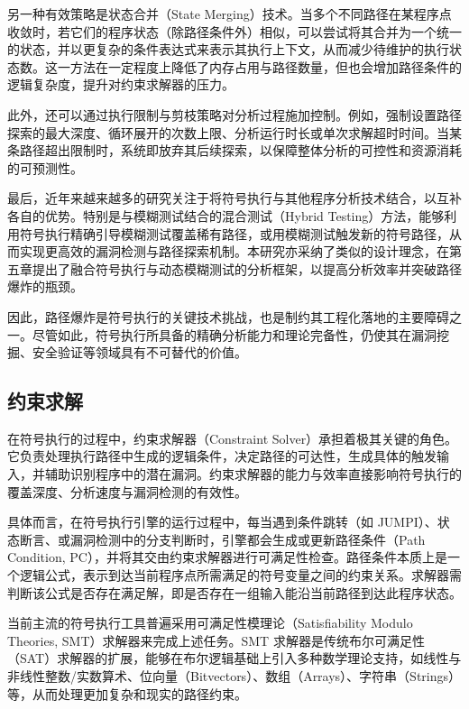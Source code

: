 \documentclass[print, master, vlined, timesmath]{DissertUESTC}
\begin{document}
另一种有效策略是状态合并\textsuperscript{\cite{zhang2024compiler}}（State Merging）技术。当多个不同路径在某程序点收敛时，若它们的程序状态（除路径条件外）相似，可以尝试将其合并为一个统一的状态，并以更复杂的条件表达式来表示其执行上下文，从而减少待维护的执行状态数。这一方法在一定程度上降低了内存占用与路径数量，但也会增加路径条件的逻辑复杂度，提升对约束求解器的压力。

此外，还可以通过执行限制与剪枝策略对分析过程施加控制。例如，强制设置路径探索的最大深度、循环展开的次数上限、分析运行时长或单次求解超时时间。当某条路径超出限制时，系统即放弃其后续探索，以保障整体分析的可控性和资源消耗的可预测性。

最后，近年来越来越多的研究关注于将符号执行与其他程序分析技术结合，以互补各自的优势\textsuperscript{\cite{liang2025vulseye}}\textsuperscript{\cite{wu2024we}}\textsuperscript{\cite{han2024ethchecker}}。特别是与模糊测试结合的混合测试（Hybrid Testing）方法，能够利用符号执行精确引导模糊测试覆盖稀有路径，或用模糊测试触发新的符号路径，从而实现更高效的漏洞检测与路径探索机制。本研究亦采纳了类似的设计理念，在第五章提出了融合符号执行与动态模糊测试的分析框架，以提高分析效率并突破路径爆炸的瓶颈。

因此，路径爆炸是符号执行的关键技术挑战，也是制约其工程化落地的主要障碍之一。尽管如此，符号执行所具备的精确分析能力和理论完备性，仍使其在漏洞挖掘、安全验证等领域具有不可替代的价值。

\subsection{约束求解}

在符号执行的过程中，约束求解器\textsuperscript{\cite{barrett2024satisfiability}}（Constraint Solver）承担着极其关键的角色。它负责处理执行路径中生成的逻辑条件，决定路径的可达性，生成具体的触发输入，并辅助识别程序中的潜在漏洞。约束求解器的能力与效率直接影响符号执行的覆盖深度、分析速度与漏洞检测的有效性\textsuperscript{\cite{shuai2024partial}}。

具体而言，在符号执行引擎的运行过程中，每当遇到条件跳转（如 JUMPI）、状态断言、或漏洞检测中的分支判断时，引擎都会生成或更新路径条件（Path Condition, PC），并将其交由约束求解器进行可满足性检查。路径条件本质上是一个逻辑公式，表示到达当前程序点所需满足的符号变量之间的约束关系。求解器需判断该公式是否存在满足解，即是否存在一组输入能沿当前路径到达此程序状态。

当前主流的符号执行工具普遍采用可满足性模理论（Satisfiability Modulo Theories, SMT）求解器来完成上述任务。SMT 求解器是传统布尔可满足性（SAT）求解器的扩展，能够在布尔逻辑基础上引入多种数学理论支持，如线性与非线性整数/实数算术、位向量（Bitvectors）、数组（Arrays）、字符串（Strings）等，从而处理更加复杂和现实的路径约束。
\end{document}
